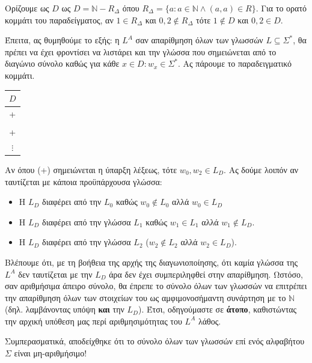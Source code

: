 \documentclass[]{article}
\begin{document}
Ορίζουμε ως $D$  ως $D = \mathbb{N} - R_\Delta$ όπου $R_\Delta = \{a : a \in \mathbb{N} \land (a,a) \in R\}$. Για το ορατό κομμάτι του παραδείγματος, αν $1 \in R_\Delta$ και $0, 2 \notin R_\Delta$ τότε $1 \notin D$ και $0, 2 \in D$.

Έπειτα, ας θυμηθούμε το εξής: η $L^A$ σαν απαρίθμηση όλων των γλωσσών $L \subseteq \Sigma^*$, θα πρέπει να έχει φροντίσει να λιστάρει και την γλώσσα που σημειώνεται από το διαγώνιο σύνολο καθώς για κάθε $x \in D : w_x \in \Sigma^*$. Ας πάρουμε το παραδειγματικό κομμάτι. \pagebreak

\begin{center}
	\begin{tabular}{|c|}
		\multicolumn{1}{c}{$D$} \\ \hline
		+ \\ \hline
		\\ \hline
		+ \\ \hline
		\multicolumn{1}{c}{$\vdots$}
	\end{tabular}
\end{center}

Αν όπου (+) σημειώνεται η ύπαρξη λέξεως, τότε $w_0, w_2 \in L_D$.
Ας δούμε λοιπόν αν ταυτίζεται με κάποια προϋπάρχουσα γλώσσα:
\begin{itemize}
	\item Η $L_D$ διαφέρει από την $L_0$ καθώς $w_0 \notin L_0$ αλλά $w_0 \in L_D$
	\item Η $L_D$ διαφέρει από την γλώσσα $L_1$ καθώς $w_1 \in L_1$ αλλά $w_1 \notin L_D$.
	\item Η $L_D$ διαφέρει από την γλώσσα $L_2$ ($w_2 \notin L_2$ αλλά $w_2 \in L_D$).
\end{itemize}

Βλέπουμε ότι, με τη βοήθεια της αρχής της διαγωνιοποίησης, ότι καμία γλώσσα της $L^A$ δεν ταυτίζεται με την $L_D$ άρα δεν έχει συμπεριληφθεί στην απαρίθμηση. Ωστόσο, σαν αριθμήσιμα άπειρο σύνολο, θα έπρεπε το σύνολο όλων των γλωσσών να επιτρέπει την απαρίθμηση όλων των στοιχείων του ως αμφιμονοσήμαντη συνάρτηση με το $\mathbb{N}$ (δηλ. λαμβάνοντας υπόψη \textbf{και} την $L_D$). Έτσι, οδηγούμαστε σε \textbf{άτοπο}, καθιστώντας την αρχική υπόθεση μας περί αριθμησιμότητας του $L^A$ λάθος.

Συμπερασματικά, αποδείχθηκε ότι το σύνολο όλων των γλωσσών επί ενός αλφαβήτου $\Sigma$ είναι μη-αριθμήσιμο!
\end{document}

